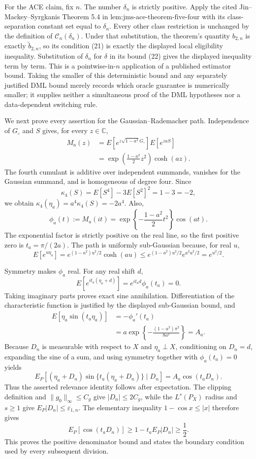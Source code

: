 For the ACE claim, fix \(n\).  The number \(\delta_n\) is strictly positive.  Apply the cited Jin--Mackey--Syrgkanis Theorem 5.4 in \(\text{lem:jms-ace-theorem-five-four}\) with its class-separation constant set equal to \(\delta_n\).  Every other class restriction is unchanged by the definition of \(\mathcal C_n(\delta_n)\).  Under that substitution, the theorem's quantity \(b_{2,n}\) is exactly \(\widetilde b_{2,n}\), so its condition (21) is exactly the displayed local eligibility inequality.  Substitution of \(\delta_n\) for \(\delta\) in its bound (22) gives the displayed inequality term by term.  This is a pointwise-in-\(n\) application of a published estimator bound.  Taking the smaller of this deterministic bound and any separately justified DML bound merely records which oracle guarantee is numerically smaller; it supplies neither a simultaneous proof of the DML hypotheses nor a data-dependent switching rule.

We next prove every assertion for the Gaussian--Rademacher path.  Independence of \(G_{\circ}\) and \(S\) gives, for every \(z\in\mathbb C\),
\[
\begin{aligned}
 M_a(z)
 &=E[e^{z\sqrt{1-a^2}G_{\circ}}]E[e^{zaS}]\\
 &=\exp\!\left(\frac{1-a^2}{2}z^2\right)\cosh(az).
\end{aligned}
\]
The fourth cumulant is additive over independent summands, vanishes for the Gaussian summand, and is homogeneous of degree four.  Since
\[
 \kappa_4(S)=E[S^4]-3E[S^2]^2=1-3=-2,
\]
we obtain \(\kappa_4(\eta_a)=a^4\kappa_4(S)=-2a^4\).  Also,
\[
 \phi_a(t):=M_a(it)
 =\exp\!\left\{-\frac{1-a^2}{2}t^2\right\}\cos(at).
\]
The exponential factor is strictly positive on the real line, so the first positive zero is \(t_a=\pi/(2a)\).  The path is uniformly sub-Gaussian because, for real \(u\),
\[
 E[e^{u\eta_a}]
 =e^{(1-a^2)u^2/2}\cosh(au)
 \le e^{(1-a^2)u^2/2}e^{a^2u^2/2}
 =e^{u^2/2}.
\]

Symmetry makes \(\phi_a\) real.  For any real shift \(d\),
\[
 E[e^{it_a(\eta_a+d)}]
 =e^{it_ad}\phi_a(t_a)=0.
\]
Taking imaginary parts proves exact sine annihilation.  Differentiation of the characteristic function is justified by the displayed sub-Gaussian bound, and
\[
\begin{aligned}
 E[\eta_a\sin(t_a\eta_a)]
 &=-\phi_a'(t_a)\\
 &=a\exp\!\left\{-\frac{(1-a^2)\pi^2}{8a^2}\right\}
 =A_a.
\end{aligned}
\]
Because \(D_n\) is measurable with respect to \(X\) and \(\eta_a\perp X\), conditioning on \(D_n=d\), expanding the sine of a sum, and using symmetry together with \(\phi_a(t_a)=0\) yields
\[
 E_P[(\eta_a+D_n)\sin\{t_a(\eta_a+D_n)\}\mid D_n]
 =A_a\cos(t_aD_n).
\]
Thus the asserted relevance identity follows after expectation.  The clipping definition and \(\lVert g_0\rVert_{\infty}\le C_g\) give \(\lvert D_n\rvert\le2C_g\), while the \(L^s(P_X)\) radius and \(s\ge1\) give \(E_P\lvert D_n\rvert\le\varepsilon_{1,n}\).  The elementary inequality \(1-\cos x\le\lvert x\rvert\) therefore gives
\[
 E_P[\cos(t_aD_n)]
 \ge1-t_aE_P\lvert D_n\rvert
 \ge\frac12.
\]
This proves the positive denominator bound and states the boundary condition used by every subsequent division.

